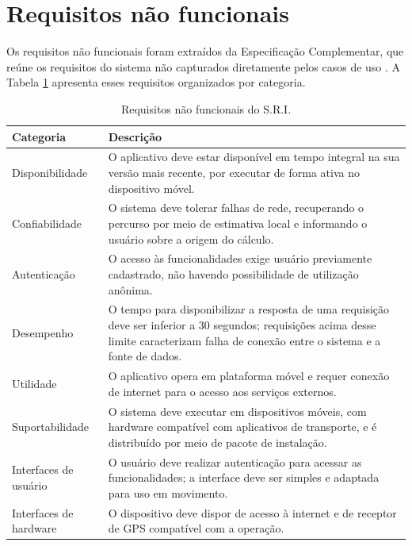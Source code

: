 \section{Requisitos não funcionais}

Os requisitos não funcionais foram extraídos da Especificação Complementar, que reúne os requisitos do sistema não capturados diretamente pelos casos de uso \cite{sriEspecComp2025}. A Tabela \ref{tab:requisitos-nao-funcionais} apresenta esses requisitos organizados por categoria.

\begin{table}[!ht]
    \centering
    \caption{Requisitos não funcionais do S.R.I.}
    \label{tab:requisitos-nao-funcionais}
    \begin{tabular}{p{3.5cm} p{11cm}}
        \hline
        \textbf{Categoria} & \textbf{Descrição} \\
        \hline
        Disponibilidade & O aplicativo deve estar disponível em tempo integral na sua versão mais recente, por executar de forma ativa no dispositivo móvel. \\
        \hline
        Confiabilidade & O sistema deve tolerar falhas de rede, recuperando o percurso por meio de estimativa local e informando o usuário sobre a origem do cálculo. \\
        \hline
        Autenticação & O acesso às funcionalidades exige usuário previamente cadastrado, não havendo possibilidade de utilização anônima. \\
        \hline
        Desempenho & O tempo para disponibilizar a resposta de uma requisição deve ser inferior a 30 segundos; requisições acima desse limite caracterizam falha de conexão entre o sistema e a fonte de dados. \\
        \hline
        Utilidade & O aplicativo opera em plataforma móvel e requer conexão de internet para o acesso aos serviços externos. \\
        \hline
        Suportabilidade & O sistema deve executar em dispositivos móveis, com hardware compatível com aplicativos de transporte, e é distribuído por meio de pacote de instalação. \\
        \hline
        Interfaces de usuário & O usuário deve realizar autenticação para acessar as funcionalidades; a interface deve ser simples e adaptada para uso em movimento. \\
        \hline
        Interfaces de hardware & O dispositivo deve dispor de acesso à internet e de receptor de GPS compatível com a operação. \\

\end{tabular}
\end{table}
